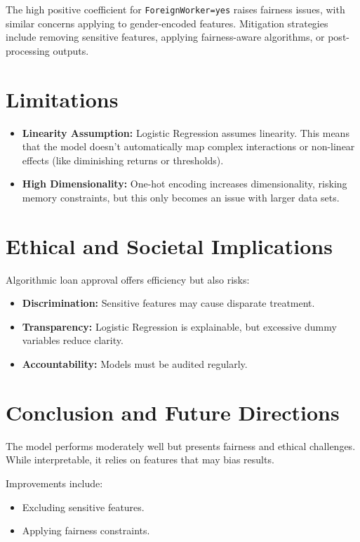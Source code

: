 \documentclass[12pt]{article}
\begin{document}
	The high positive coefficient for \texttt{ForeignWorker=yes} raises fairness issues, with similar concerns applying to gender-encoded features. Mitigation strategies include removing sensitive features, applying fairness-aware algorithms, or post-processing outputs.
	
	\section{Limitations}
	\begin{itemize}
		\item \textbf{Linearity Assumption:} Logistic Regression assumes linearity. This means that the model doesn't automatically map complex interactions or non-linear effects (like diminishing returns or thresholds).
		\item \textbf{High Dimensionality:} One-hot encoding increases dimensionality, risking memory constraints, but this only becomes an issue with larger data sets.
	\end{itemize}
	
	\section{Ethical and Societal Implications}
	Algorithmic loan approval offers efficiency but also risks:
	\begin{itemize}
		\item \textbf{Discrimination:} Sensitive features may cause disparate treatment.
		\item \textbf{Transparency:} Logistic Regression is explainable, but excessive dummy variables reduce clarity.
		\item \textbf{Accountability:} Models must be audited regularly.
	\end{itemize}
	
	\section{Conclusion and Future Directions}
	The model performs moderately well but presents fairness and ethical challenges. While interpretable, it relies on features that may bias results. 
	
	Improvements include:
	\begin{itemize}
		\item Excluding sensitive features.
		\item Applying fairness constraints.
	\end{itemize}
	
\end{document}
